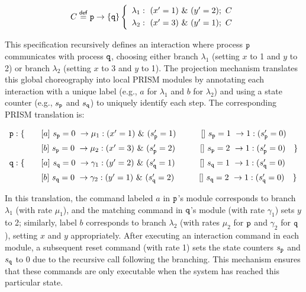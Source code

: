 \[
\begin{array}{lll}
C \stackrel{\mathsf{def}}{=} \mathtt{p}\rightarrow \{\mathtt{q}\}
\left\{
\begin{array}{lll}
\lambda_1: \ (x'=1)\ \&\ (y'=2);\ C\\[1mm]
\lambda_2: \ (x'=3)\ \&\ (y'=1);\ C
\end{array}
\right.
\end{array}
\]

This specification recursively defines an interaction where process \(\mathtt{p}\) communicates with process \(\mathtt{q}\), choosing either branch \(\lambda_1\) (setting \(x\) to 1 and \(y\) to 2) or branch \(\lambda_2\) (setting \(x\) to 3 and \(y\) to 1). 
The projection mechanism translates this global choreography into local PRISM modules by annotating each interaction with a unique label (e.g., \(a\) for \(\lambda_1\) and \(b\) for \(\lambda_2\)) and using a state counter (e.g., \(s_{\mathtt{p}}\) and \(s_{\mathtt{q}}\)) to uniquely identify each step. 
The corresponding PRISM translation is:

\[
\begin{array}{llll}
\role{p}: \{ & \quad \commandBase {a}{s_{\role p}=0} {\mu_1:(x'=1)\ \&\ (s_{\role p}'=1)} \quad\qquad \commandBase {}{s_{\role p}=1} {1:(s_{\role p}'=0)}\\[2mm]
              & \quad \commandBase {b}{s_{\role p}=0} {\mu_2:(x'=3)\ \&\ (s_{\role p}'=2)} \quad\qquad \commandBase {}{s_{\role p}=2} {1:(s_{\role p}'=0)} \quad \}\\[2mm]
\role{q}: \{ & \quad \commandBase {a}{s_{\role q}=0} {\gamma_1:(y'=2)\ \&\ (s_{\role q}'=1)} \qquad\quad \commandBase {}{s_{\role q}=1} {1:(s_{\role q}'=0)}\\[2mm]
              & \quad \commandBase {b}{s_{\role q}=0} {\gamma_2:(y'=1)\ \&\ (s_{\role q}'=2)} \qquad\quad \commandBase {}{s_{\role q}=2} {1:(s_{\role q}'=0)} \quad \}\\
\end{array}
\]

In this translation, the command labeled \(a\) in \(\mathtt{p}\)’s module corresponds to branch \(\lambda_1\) (with rate \(\mu_1\)), and the matching command in \(\mathtt{q}\)’s module (with rate \(\gamma_1\)) sets \(y\) to 2; similarly, label \(b\) corresponds to branch \(\lambda_2\) (with rates \(\mu_2\) for \(\mathtt{p}\) and \(\gamma_2\) for \(\mathtt{q}\)), setting \(x\) and \(y\) appropriately. 
After executing an interaction command in each module, a subsequent reset command (with rate 1) sets the state counters \( s_{\mathtt{p}} \) and \( s_{\mathtt{q}} \) to 0 due to the recursive call following the branching. This mechanism ensures that these commands are only executable when the system has reached this particular state.



